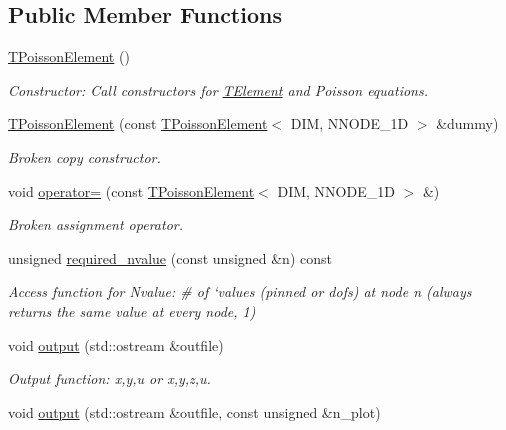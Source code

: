 \subsection*{Public Member Functions}
\begin{DoxyCompactItemize}
\item 
\hyperlink{classoomph_1_1TPoissonElement_a63f38f2a34b1b9663eb3089423043243}{T\+Poisson\+Element} ()
\begin{DoxyCompactList}\small\item\em Constructor\+: Call constructors for \hyperlink{classoomph_1_1TElement}{T\+Element} and Poisson equations. \end{DoxyCompactList}\item 
\hyperlink{classoomph_1_1TPoissonElement_a1af1fe9dc7fbd290654ecc8a0f2b211b}{T\+Poisson\+Element} (const \hyperlink{classoomph_1_1TPoissonElement}{T\+Poisson\+Element}$<$ D\+IM, N\+N\+O\+D\+E\+\_\+1D $>$ \&dummy)
\begin{DoxyCompactList}\small\item\em Broken copy constructor. \end{DoxyCompactList}\item 
void \hyperlink{classoomph_1_1TPoissonElement_a97c2a982c586228f55d44ba2ecdb08a4}{operator=} (const \hyperlink{classoomph_1_1TPoissonElement}{T\+Poisson\+Element}$<$ D\+IM, N\+N\+O\+D\+E\+\_\+1D $>$ \&)
\begin{DoxyCompactList}\small\item\em Broken assignment operator. \end{DoxyCompactList}\item 
unsigned \hyperlink{classoomph_1_1TPoissonElement_aa79feab5549359f30145c96ee89023e1}{required\+\_\+nvalue} (const unsigned \&n) const
\begin{DoxyCompactList}\small\item\em Access function for Nvalue\+: \# of `values\textquotesingle{} (pinned or dofs) at node n (always returns the same value at every node, 1) \end{DoxyCompactList}\item 
void \hyperlink{classoomph_1_1TPoissonElement_a44da26efce008c0c7c986f9277cd3302}{output} (std\+::ostream \&outfile)
\begin{DoxyCompactList}\small\item\em Output function\+: x,y,u or x,y,z,u. \end{DoxyCompactList}\item 
void \hyperlink{classoomph_1_1TPoissonElement_a8a9139cd1265c160c2c88df86fae8b6c}{output} (std\+::ostream \&outfile, const unsigned \&n\+\_\+plot)

\end{DoxyCompactItemize}
